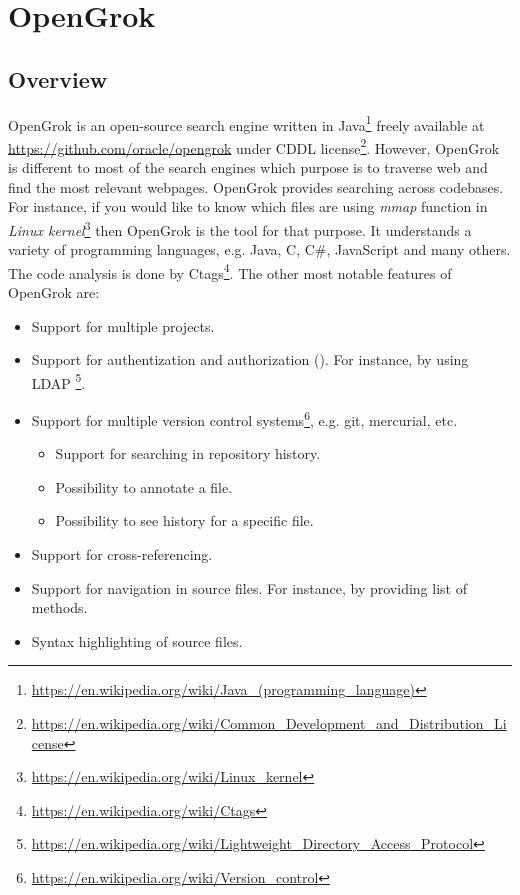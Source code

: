 \chapter{OpenGrok}
\label{chap:opengrok}

\section{Overview}
\label{opengrok_overview}
OpenGrok is an open-source search engine written in
Java\footnote{\url{https://en.wikipedia.org/wiki/Java\_(programming\_language)}}
freely available at \url{https://github.com/oracle/opengrok} under CDDL
license\footnote{\url{https://en.wikipedia.org/wiki/Common\_Development\_and\_Distribution\_License}}.
However, OpenGrok is different to most of the search engines which purpose is to traverse web and find the most relevant
webpages. OpenGrok provides searching across codebases. For instance, if you would like to know which files are using
\textit{mmap} function in \textit{Linux kernel}\footnote{\url{https://en.wikipedia.org/wiki/Linux\_kernel}} then
OpenGrok is the tool for that purpose. It understands a variety of
programming languages, e.g. Java, C, C\#, JavaScript and many others. The code analysis is done by
Ctags\footnote{\url{https://en.wikipedia.org/wiki/Ctags}}.
The other most notable features of OpenGrok are:
\begin{itemize}
    \item Support for multiple projects.
    \item Support for authentization and authorization (\cite{OpengrokAuthLayer}). For instance, by using LDAP
        \footnote{\url{https://en.wikipedia.org/wiki/Lightweight_Directory_Access_Protocol}}.
    \item Support for multiple version control systems\footnote{\url{https://en.wikipedia.org/wiki/Version\_control}},
        e.g. git, mercurial, etc.
        \begin{itemize}
            \item Support for searching in repository history.
            \item Possibility to annotate a file.
            \item Possibility to see history for a specific file.
        \end{itemize}
    \item Support for cross-referencing.
    \item Support for navigation in source files. For instance, by providing list of methods.
    \item Syntax highlighting of source files.
\end{itemize}

